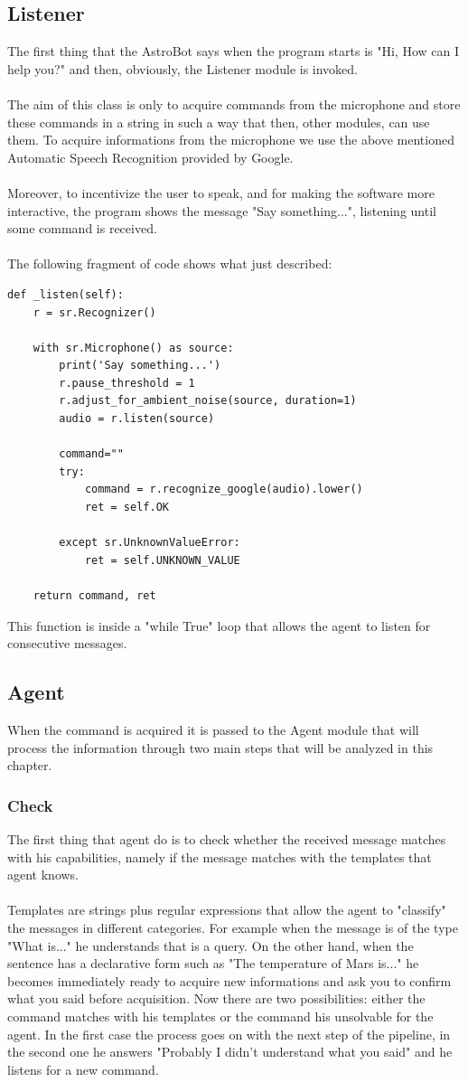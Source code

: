 \documentclass[12pt, a4paper]{article}
\begin{document}
\subsection{Listener}
The first thing that the AstroBot says when the program starts is "Hi, How can I help you?" and then, obviously, the Listener module is invoked.
\\\\The aim of this class is only to acquire commands from the microphone and store these commands in a string in such a way that then, other modules, can use them. To acquire informations from the microphone we use the above mentioned Automatic Speech Recognition provided by Google. 
\\\\Moreover, to incentivize the user to speak, and for making the software more interactive, the program shows the message "Say something...", listening until some command is received.
\\\\The following fragment of code shows what just described:
\begin{lstlisting}
def _listen(self):
	r = sr.Recognizer()
	
	with sr.Microphone() as source:
		print('Say something...')
		r.pause_threshold = 1
		r.adjust_for_ambient_noise(source, duration=1)
		audio = r.listen(source)
		
		command=""
		try:
			command = r.recognize_google(audio).lower()
			ret = self.OK
		
		except sr.UnknownValueError:
			ret = self.UNKNOWN_VALUE
	
	return command, ret
\end{lstlisting}
This function is inside a "while True" loop that allows the agent to listen for consecutive messages.
\subsection{Agent}
When the command is acquired it is passed to the Agent module that will process the information through two main steps that will be analyzed in this chapter.
\subsubsection{Check}
The first thing that agent do is to check whether the received message matches with his capabilities, namely if the message matches with the templates that agent knows.
\\\\ Templates are strings plus regular expressions that allow the agent to "classify" the messages in different categories. For example when the message is of the type "What is..." he understands that is a query. On the other hand, when the sentence has a declarative form such as "The temperature of Mars is..." he becomes immediately ready to acquire new informations and ask you to confirm what you said before acquisition.
Now there are two possibilities: either the command matches with his templates or the command his unsolvable for the agent.
In the first case the process goes on with the next step of the pipeline, in the second one he answers "Probably I didn't understand what you said" and he listens for a new command. 
\end{document}
